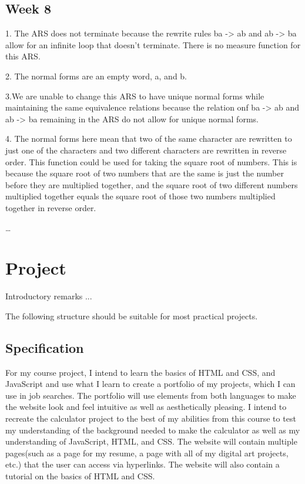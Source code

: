\documentclass{article}
\theoremstyle{theorem}
\theoremstyle{definition}
\theoremstyle{remark}
\begin{document}
\subsection{Week 8}

1. The ARS does not terminate because the rewrite rules ba -> ab and ab -> ba allow for an infinite loop that doesn't terminate. There is no measure function for this ARS. 

2. The normal forms are an empty word, a, and b. 

3.We are unable to change this ARS to have unique normal forms while maintaining the same equivalence relations because the relation onf ba -> ab and ab -> ba remaining in the ARS do not allow for unique normal forms. 

4. The normal forms here mean that two of the same character are rewritten to just one of the characters and two different characters are rewritten in reverse order. This function could be used for taking the square root of numbers. This is because the square root of two numbers that are the same is just the number before they are multiplied together, and the square root of two different numbers multiplied together equals the square root of those two numbers multiplied together in reverse order.

\ldots

\section{Project}

Introductory remarks ...

The following structure should be suitable for most practical projects. 

\subsection{Specification}

For my course project, I intend to learn the basics of HTML and CSS, and JavaScript and use what I learn to create a portfolio of my projects, which I can use in job searches. The portfolio will use elements from both languages to make the website look and feel intuitive as well as aesthetically pleasing. I intend to recreate the calculator project to the best of my abilities from this course to test my understanding of the background needed to make the calculator as well as my understanding of JavaScript, HTML, and CSS. The website will contain multiple pages(such as a page for my resume, a page with all of my digital art projects, etc.) that the user can access via hyperlinks. The website will also contain a tutorial on the basics of HTML and CSS.
\end{document}
